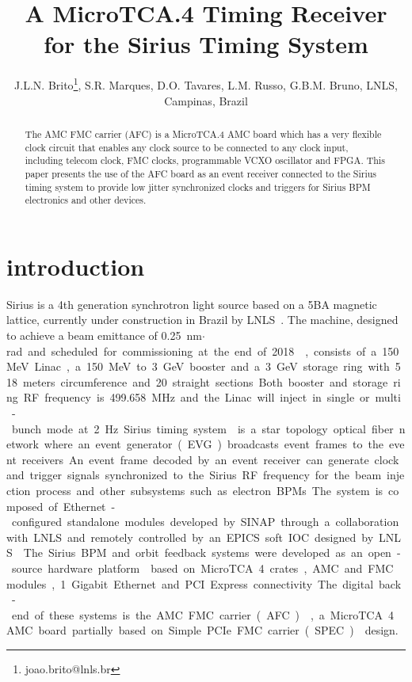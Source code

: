\documentclass[a4paper,
               biblatex,      %
               ]{jacow}
\begin{document}
\title{A MicroTCA.4  Timing Receiver for the Sirius Timing System}

\author{J.L.N. Brito\thanks{joao.brito@lnls.br}, S.R. Marques, D.O. Tavares, L.M. Russo, G.B.M. Bruno, LNLS, Campinas, Brazil}
	
\maketitle


\begin{abstract}
The AMC FMC carrier (AFC) is a MicroTCA.4 AMC board which has a very flexible clock circuit that enables any clock source to be connected to any clock input, including telecom clock, FMC clocks, programmable VCXO oscillator and FPGA. This paper presents the use of the AFC board as an event receiver connected to the Sirius timing system to provide low jitter synchronized clocks and triggers for Sirius BPM electronics and other devices.
\end{abstract}


\section{introduction}

Sirius is a 4th  generation  synchrotron light source  based  on  a 5BA magnetic lattice, currently under construction in Brazil by LNLS~\cite{sirius_ipac16}. The machine, designed to achieve a beam emittance of \SI{0.25}{nm$\cdot$rad} and scheduled for commissioning at the end of 2018~\cite{rodrigues2016sirius}, consists of a 150 MeV Linac, a 150 MeV to 3 GeV booster and a 3 GeV storage ring with 518 meters circumference and 20 straight sections. Both booster and storage ring RF frequency is \SI{499.658}{MHz} and the Linac will inject in single or multi-bunch mode at \SI{2}{Hz}.

Sirius timing system~\cite{timing_icalepcs15} is a star topology optical fiber network where an event generator (EVG) broadcasts event frames to the event receivers. An event frame decoded by an event receiver can generate clock and trigger signals synchronized to the Sirius RF frequency for the beam injection process and other subsystems such as electron BPMs. The system is composed of Ethernet-configured standalone modules developed by SINAP through a collaboration with LNLS and remotely controlled by an EPICS soft IOC designed by LNLS~\cite{sinap-timing-epics-ioc}.

The Sirius BPM and orbit feedback systems were developed as an open-source hardware platform~\cite{ebpm_icalepcs13} based on MicroTCA.4 crates, AMC and FMC modules, 1 Gigabit Ethernet and PCI Express connectivity. The digital back-end of these systems is the AMC FMC carrier (AFC)~\cite{afc-git}, a MicroTCA.4 AMC board partially based on Simple PCIe FMC carrier (SPEC)~\cite{spec} design. 
\end{document}
